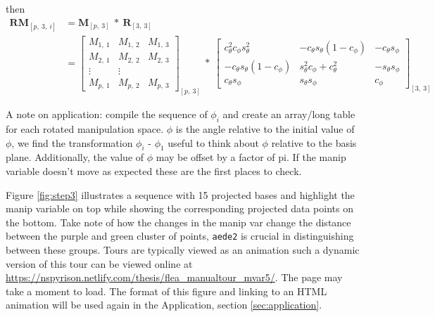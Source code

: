 \documentclass{monashthesis}
\begin{document}
then
\begin{align*}
  \textbf{RM}_{[p,~3,~i]}
  &= \textbf{M}_{[p,~3]} ~*~ \textbf{R}_{[3,~3]} \\
  &= \begin{bmatrix}
    M_{1,~1} & M_{1,~2} & M_{1,~3} \\
    M_{2,~1} & M_{2,~2} & M_{2,~3} \\
    \vdots   & \vdots   \\
    M_{p,~1} & M_{p,~2} & M_{p,~3}
  \end{bmatrix}_{[p,~3]}
    ~*~
  \begin{bmatrix}
    c_\theta^2 c_\phi s_\theta^2 &
    -c_\theta s_\theta (1 - c_\phi) &
    -c_\theta s_\phi \\
    -c_\theta s_\theta (1 - c_\phi) &
    s_\theta^2 c_\phi + c_\theta^2 &
    -s_\theta s_\phi \\
    c_\theta s_\phi &
    s_\theta s_\phi &
    c_\phi
  \end{bmatrix}_{[3,~3]}
\end{align*}

A note on application: compile the sequence of \(\phi_i\) and create an array/long table for each rotated manipulation space. \(\phi\) is the angle relative to the initial value of \(\phi\), we find the transformation \(\phi_i\) - \(\phi_1\) useful to think about \(\phi\) relative to the basis plane. Additionally, the value of \(\phi\) may be offset by a factor of pi. If the manip variable doesn't move as expected these are the first places to check.

\begin{Shaded}
\begin{Highlighting}[]
 
\OtherTok{\textless{}{-}}\SpecialCharTok{+} 
\OtherTok{\textless{}{-}} \NormalTok{(manip\_space, theta, phi)[, }\SpecialCharTok{:}\NormalTok{]}
\NormalTok{\}}
\end{Highlighting}
\end{Shaded}

Figure \ref{fig:step3} illustrates a sequence with 15 projected bases and highlight the manip variable on top while showing the corresponding projected data points on the bottom. Take note of how the changes in the manip var change the distance between the purple and green cluster of points, \texttt{aede2} is crucial in distinguishing between these groups. Tours are typically viewed as an animation such a dynamic version of this tour can be viewed online at \url{https://nspyrison.netlify.com/thesis/flea_manualtour_mvar5/}. The page may take a moment to load. The format of this figure and linking to an HTML animation will be used again in the Application, section \ref{sec:application}.
\end{document}

